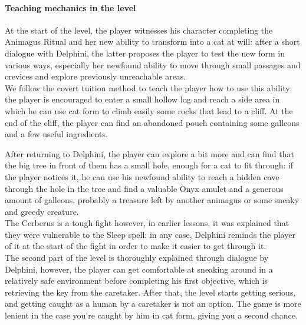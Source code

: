 \paragraph{Teaching mechanics in the level}
At the start of the level, the player witnesses his character completing the Animagus Ritual and her new ability to transform into a cat at will: after a short dialogue with Delphini, the latter proposes the player to test the new form in various
ways, especially her newfound ability to move through small passages and crevices and explore previously unreachable areas. \\

We follow the covert tuition method to teach the player how to use this ability: the player is encouraged to enter a small hollow log and reach a side area in which he can use cat form to climb easily some rocks that lead to a cliff. At the end of the cliff, the player can find an abandoned pouch containing some galleons and a few useful ingredients.

After returning to Delphini, the player can explore a bit more and can find that the big tree in front of them has a small hole, enough for a cat to fit through: if the player notices it, he can use his newfound ability to reach a hidden cave through the hole in the tree and find a valuable Onyx amulet and a generous amount of galleons, probably a treasure left by another animagus or some sneaky and greedy creature.\\

The Cerberus is a tough fight however, in earlier lessons, it was explained that they were vulnerable to the Sleep spell: in any case, Delphini reminds the player of it at the start of the fight in order to make it easier to get through it. \\

The second part of the level is thoroughly explained through dialogue by Delphini, however, the player can get comfortable at sneaking around in a relatively safe environment before completing his first objective, which is retrieving the key from the caretaker. After that, the level starts getting serious, and getting caught as a human by a caretaker is not an option. The game is more lenient in the case you're caught by him in cat form, giving you a second chance.

\pagebreak